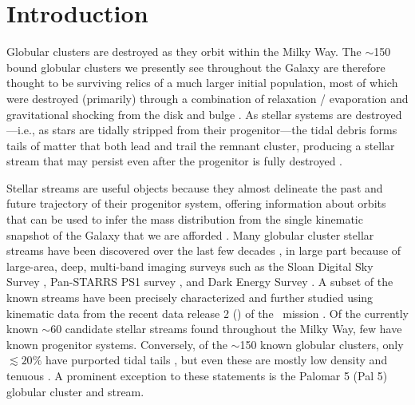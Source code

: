 \documentclass[twocolumn]{aastex63}
\begin{document}

\section{Introduction} \label{sec:intro}

Globular clusters are destroyed as they orbit within the Milky Way.
The $\sim$150 bound globular clusters we presently see throughout the Galaxy \citep{Harris:2010} are therefore thought to be surviving relics of a much larger initial population, most of which were destroyed (primarily) through a combination of relaxation / evaporation and gravitational shocking from the disk and bulge \citep[e.g.,][]{Gnedin:1997, Gnedin:2014}.
As stellar systems are destroyed---i.e., as stars are tidally stripped from their progenitor---the tidal debris forms tails of matter that both lead and trail the remnant cluster, producing a stellar stream that may persist even after the progenitor is fully destroyed \citep[e.g.,][]{Johnston:1996}.

Stellar streams are useful objects because they almost \citep[see][]{Sanders:2013} delineate the past and future trajectory of their progenitor system, offering information about orbits that can be used to infer the mass distribution from the single kinematic snapshot of the Galaxy that we are afforded \citep[e.g.,][]{Johnston:1999, Sanders:2013, PriceWhelan:2014, Bonaca:2018}. %
Many globular cluster stellar streams have been discovered over the last few decades \citep[see, e.g.,][]{Grillmair:2016, Shipp:2018}, in large part because of large-area, deep, multi-band imaging surveys such as the Sloan Digital Sky Survey \citep[SDSS;][]{York:2000}, Pan-STARRS PS1 survey \citep{Chambers:2016}, and Dark Energy Survey \citep{DES:2016}.
A subset of the known streams have been precisely characterized and further studied \citep[e.g.,][]{PriceWhelan:2018, Malhan:2018, Shipp:2019} using kinematic data from the recent data release 2 () of the \Gaia\ mission \citep{Gaia:2016, Gaia:2018}.
Of the currently known $\sim$60 candidate stellar streams found throughout the Milky Way, few have known progenitor systems.
Conversely, of the $\sim$150 known globular clusters, only $\lesssim 20\%$ have purported tidal tails \citep[e.g.,][]{Leon:2000, Kundu:2019}, but even these are mostly low density and tenuous \citep[as might be expected, e.g.,][]{Balbinot:2018}.
A prominent exception to these statements is the Palomar 5 (Pal 5) globular cluster and stream.
\end{document}

